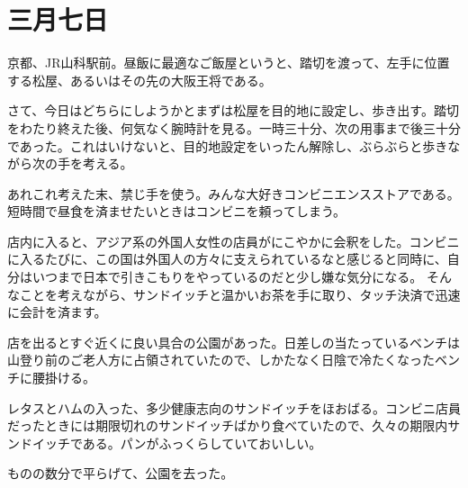 
\chapter{三月七日}
  京都、JR山科駅前。昼飯に最適なご飯屋というと、踏切を渡って、左手に位置する松屋、あるいはその先の大阪王将である。

  さて、今日はどちらにしようかとまずは松屋を目的地に設定し、歩き出す。踏切をわたり終えた後、何気なく腕時計を見る。一時三十分、次の用事まで後三十分であった。これはいけないと、目的地設定をいったん解除し、ぶらぶらと歩きながら次の手を考える。

  あれこれ考えた末、禁じ手を使う。みんな大好きコンビニエンスストアである。短時間で昼食を済ませたいときはコンビニを頼ってしまう。

  店内に入ると、アジア系の外国人女性の店員がにこやかに会釈をした。コンビニに入るたびに、この国は外国人の方々に支えられているなと感じると同時に、自分はいつまで日本で引きこもりをやっているのだと少し嫌な気分になる。
  そんなことを考えながら、サンドイッチと温かいお茶を手に取り、タッチ決済で迅速に会計を済ます。

  店を出るとすぐ近くに良い具合の公園があった。日差しの当たっているベンチは山登り前のご老人方に占領されていたので、しかたなく日陰で冷たくなったベンチに腰掛ける。

  レタスとハムの入った、多少健康志向のサンドイッチをほおばる。コンビニ店員だったときには期限切れのサンドイッチばかり食べていたので、久々の期限内サンドイッチである。パンがふっくらしていておいしい。

  ものの数分で平らげて、公園を去った。

